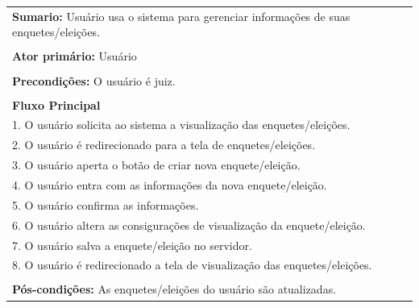 \documentclass[a4paper,12pt]{report}
\begin{document}
\begin{tabularx}{\textwidth}{|X|}\hline
	{\textbf{Sumario:}} Usuário usa o sistema para gerenciar informações de suas enquetes/eleições.\ \ \ \ \ \ \ \ \ \ \\\\
	{\textbf{Ator primário:}} Usuário \\\\
	{\textbf{Precondições:}} O usuário é juiz.\\\\
	{\textbf{Fluxo Principal}}\\
	1. O usuário solicita ao sistema a visualização das enquetes/eleições.\\
	2. O usuário é redirecionado para a tela de enquetes/eleições. \\
	3. O usuário aperta o botão de criar nova enquete/eleição. \\
	4. O usuário entra com as informações da nova enquete/eleição.\\
	5. O usuário confirma as informações.\\
	6. O usuário altera as consigurações de visualização da enquete/eleição.\\
	7. O usuário salva a enquete/eleição no servidor.\\
	8. O usuário é redirecionado a tela de visualização das enquetes/eleições.\\\\
	{\textbf{Pós-condições:}} As enquetes/eleições do usuário são atualizadas.\\
	\hline
\end{tabularx}
\end{document}
